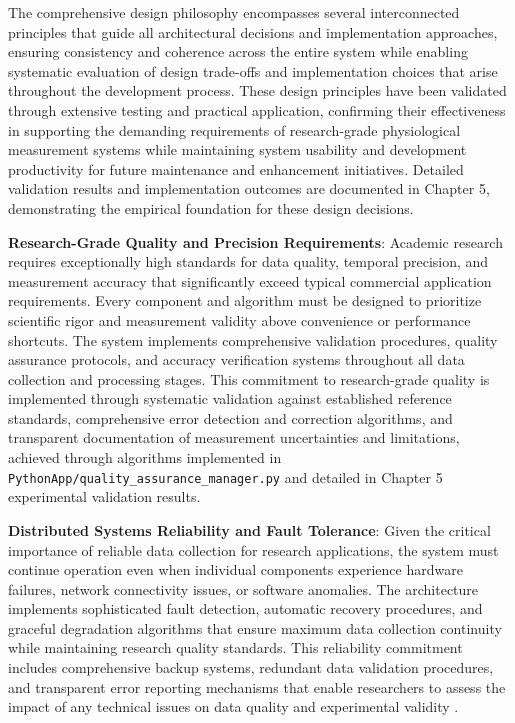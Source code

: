 \documentclass[11pt,a4paper]{article}
\begin{document}
The comprehensive design philosophy encompasses several interconnected principles that guide all architectural decisions
and implementation approaches, ensuring consistency and coherence across the entire system while enabling systematic
evaluation of design trade-offs and implementation choices that arise throughout the development process. These design
principles have been validated through extensive testing and practical application, confirming their effectiveness in
supporting the demanding requirements of research-grade physiological measurement systems while maintaining system
usability and development productivity for future maintenance and enhancement initiatives. Detailed validation results and
implementation outcomes are documented in Chapter 5, demonstrating the empirical foundation for these design
decisions.

\textbf{Research-Grade Quality and Precision Requirements}: Academic research requires exceptionally high standards for
data quality, temporal precision, and measurement accuracy that significantly exceed typical commercial application
requirements. Every component and algorithm must be designed to prioritize scientific rigor and measurement validity
above convenience or performance shortcuts. The system implements comprehensive validation procedures, quality assurance
protocols, and accuracy verification systems throughout all data collection and processing stages. This commitment to
research-grade quality is implemented through systematic validation against established reference standards,
comprehensive error detection and correction algorithms, and transparent documentation of measurement uncertainties and
limitations, achieved through algorithms implemented in \texttt{PythonApp/quality\_assurance\_manager.py} and detailed in
Chapter 5 experimental validation results.

\textbf{Distributed Systems Reliability and Fault Tolerance}: Given the critical importance of reliable data collection
for research applications, the system must continue operation even when individual components experience hardware
failures, network connectivity issues, or software anomalies. The architecture implements sophisticated fault detection,
automatic recovery procedures, and graceful degradation algorithms that ensure maximum data collection continuity while
maintaining research quality standards. This reliability commitment includes comprehensive backup systems, redundant
data validation procedures, and transparent error reporting mechanisms that enable researchers to assess the impact of
any technical issues on data quality and experimental
validity \cite{Bass2012}.
\end{document}
